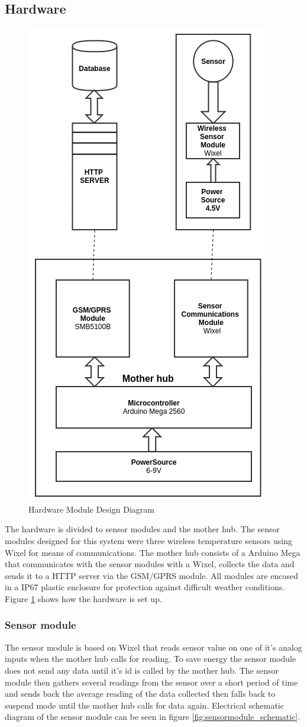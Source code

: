 \subsection{Hardware}
\begin{figure}
\centering
\includegraphics[width=0.5\linewidth]{graphics/HardwareMDD}
\caption{Hardware Module Design Diagram\label{fig:HardwareMDD}}
\end{figure}
The hardware is divided to sensor modules and the mother hub. The sensor modules 
designed for this system were three wireless temperature sensors using Wixel\cite{wixel}
for means of communications. The mother hub consists of a Arduino Mega\cite{arduinoMega}
that communicates with the sensor modules with a Wixel, collects the data 
and sends it to a HTTP server via the GSM/GPRS module\cite{SM5100B}. All modules are 
encased in a IP67\cite{ipRating} plastic enclosure for protection against difficult weather conditions.
Figure \ref{fig:HardwareMDD} shows how the hardware is set up. 
\subsubsection{Sensor module}
The sensor module is based on Wixel\cite{wixel} that reads sensor value on one of it's
analog inputs when the mother hub calls for reading. To save energy the sensor module does
not send any data until it's id is called by the mother hub. The sensor module then 
gathers several readings from the sensor over a short period of time and sends back the 
average reading of the data collected then falls back to suspend mode until the mother 
hub calls for data again. Electrical schematic diagram of the sensor module can
be seen in figure \ref{fig:sensormodule_schematic}.

